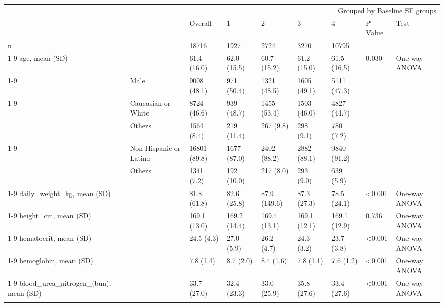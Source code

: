 \begin{tabular}{lllllllll}
\toprule
 &  & \multicolumn{7}{r}{Grouped by Baseline SF groups} \\
 &  & Overall & 1 & 2 & 3 & 4 & P-Value & Test \\
\midrule
n &  & 18716 & 1927 & 2724 & 3270 & 10795 &  &  \\
\cline{1-9}
age, mean (SD) &  & 61.4 (16.0) & 62.0 (15.5) & 60.7 (15.2) & 61.2 (15.0) & 61.5 (16.5) & 0.030 & One-way ANOVA \\
\cline{1-9}
\multirow[t]{2}{*}{gender, n (%
 & Male & 9008 (48.1) & 971 (50.4) & 1321 (48.5) & 1605 (49.1) & 5111 (47.3) &  &  \\
\cline{1-9}
\multirow[t]{3}{*}{race, n (%
 & Caucasian or White & 8724 (46.6) & 939 (48.7) & 1455 (53.4) & 1503 (46.0) & 4827 (44.7) &  &  \\
 & Others & 1564 (8.4) & 219 (11.4) & 267 (9.8) & 298 (9.1) & 780 (7.2) &  &  \\
\cline{1-9}
\multirow[t]{3}{*}{ethnicity, n (%
 & Non-Hispanic or Latino & 16801 (89.8) & 1677 (87.0) & 2402 (88.2) & 2882 (88.1) & 9840 (91.2) &  &  \\
 & Others & 1341 (7.2) & 192 (10.0) & 217 (8.0) & 293 (9.0) & 639 (5.9) &  &  \\
\cline{1-9}
daily_weight_kg, mean (SD) &  & 81.8 (61.8) & 82.6 (25.8) & 87.9 (149.6) & 87.3 (27.3) & 78.5 (24.1) & <0.001 & One-way ANOVA \\
\cline{1-9}
height_cm, mean (SD) &  & 169.1 (13.0) & 169.2 (14.4) & 169.4 (13.1) & 169.1 (12.1) & 169.1 (12.9) & 0.736 & One-way ANOVA \\
\cline{1-9}
hematocrit, mean (SD) &  & 24.5 (4.3) & 27.0 (5.9) & 26.2 (4.7) & 24.3 (3.2) & 23.7 (3.8) & <0.001 & One-way ANOVA \\
\cline{1-9}
hemoglobin, mean (SD) &  & 7.8 (1.4) & 8.7 (2.0) & 8.4 (1.6) & 7.8 (1.1) & 7.6 (1.2) & <0.001 & One-way ANOVA \\
\cline{1-9}
blood_urea_nitrogen_(bun), mean (SD) &  & 33.7 (27.0) & 32.4 (23.3) & 33.0 (25.9) & 35.8 (27.6) & 33.4 (27.6) & <0.001 & One-way ANOVA \\
}}}
\end{tabular}
